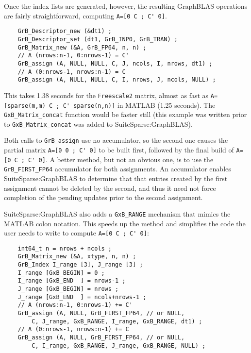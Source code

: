 \documentclass[12pt]{article}
\begin{document}
{Once the index lists are generated, however, the resulting GraphBLAS operations
are fairly straightforward, computing \verb"A=[0 C ; C' 0]".

    \vspace{-0.05in}
    {\footnotesize
    \begin{verbatim}
    GrB_Descriptor_new (&dt1) ;
    GrB_Descriptor_set (dt1, GrB_INP0, GrB_TRAN) ;
    GrB_Matrix_new (&A, GrB_FP64, n, n) ;
    // A (nrows:n-1, 0:nrows-1) = C'
    GrB_assign (A, NULL, NULL, C, J, ncols, I, nrows, dt1) ;
    // A (0:nrows-1, nrows:n-1) = C
    GrB_assign (A, NULL, NULL, C, I, nrows, J, ncols, NULL) ; \end{verbatim}}

This takes 1.38 seconds for the \verb'Freescale2' matrix, almost as fast as \newline
\verb"A=[sparse(m,m) C ; C' sparse(n,n)]" in MATLAB (1.25 seconds).
The \verb'GxB_Matrix_concat' function would be faster still (this example
was written prior to \verb'GxB_Matrix_concat' was added to SuiteSparse:GraphBLAS).

Both calls to \verb'GrB_assign' use no accumulator, so the second one
causes the partial matrix \verb"A=[0 0 ; C' 0]" to be built first, followed by
the final build of \verb"A=[0 C ; C' 0]".  A better method, but not an obvious
one, is to use the \verb'GrB_FIRST_FP64' accumulator for both assignments.  An
accumulator enables SuiteSparse:GraphBLAS to determine that that entries
created by the first assignment cannot be deleted by the second, and thus it
need not force completion of the pending updates prior to the second
assignment.

SuiteSparse:GraphBLAS also adds a \verb'GxB_RANGE' mechanism that mimics
the MATLAB colon notation.  This speeds up the method and simplifies the
code the user needs to write to compute \verb"A=[0 C ; C' 0]":

    \vspace{-0.05in}
    {\footnotesize
    \begin{verbatim}
    int64_t n = nrows + ncols ;
    GrB_Matrix_new (&A, xtype, n, n) ;
    GrB_Index I_range [3], J_range [3] ;
    I_range [GxB_BEGIN] = 0 ;
    I_range [GxB_END  ] = nrows-1 ;
    J_range [GxB_BEGIN] = nrows ;
    J_range [GxB_END  ] = ncols+nrows-1 ;
    // A (nrows:n-1, 0:nrows-1) += C'
    GrB_assign (A, NULL, GrB_FIRST_FP64, // or NULL,
        C, J_range, GxB_RANGE, I_range, GxB_RANGE, dt1) ;
    // A (0:nrows-1, nrows:n-1) += C
    GrB_assign (A, NULL, GrB_FIRST_FP64, // or NULL,
        C, I_range, GxB_RANGE, J_range, GxB_RANGE, NULL) ; \end{verbatim}}

}
\end{document}
